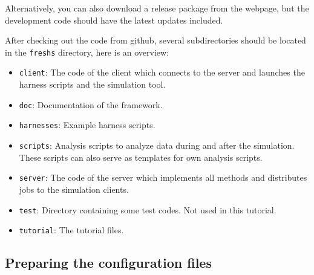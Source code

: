 \documentclass[a4paper,oneside]{article}
\begin{document}
Alternatively, you can also download a release package from the webpage, but the development code should have the latest updates included.


After checking out the code from github, several subdirectories should be located in the \verb+freshs+ directory, here is an overview:
\begin{itemize}
 \item \verb+client+: The code of the client which connects to the server and launches the harness scripts and the simulation tool.
 \item \verb+doc+: Documentation of the framework.
 \item \verb+harnesses+: Example harness scripts.
 \item \verb+scripts+: Analysis scripts to analyze data during and after the simulation. These scripts can also serve as templates for own analysis scripts.
 \item \verb+server+: The code of the server which implements all methods and distributes jobs to the simulation clients.
 \item \verb+test+: Directory containing some test codes. Not used in this tutorial.
 \item \verb+tutorial+: The tutorial files.
\end{itemize}

\subsection{Preparing the configuration files}\label{sec:configfiles}
\end{document}
